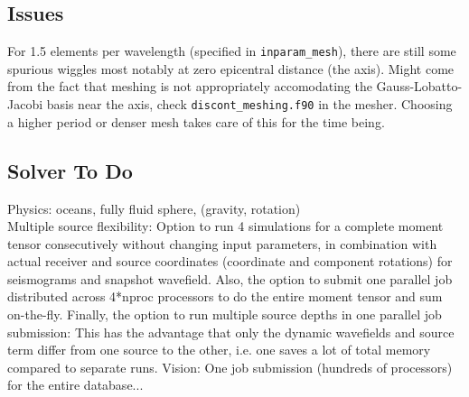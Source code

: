 \documentclass[11pt,letter,fleqn,english,notitlepage]{article}
\begin{document}
\subsection{Issues}
For 1.5 elements per wavelength (specified in {\tt inparam\_mesh}), there are
still some spurious wiggles most notably at zero epicentral distance (the
axis). Might come from the fact that meshing is not appropriately accomodating
the Gauss-Lobatto-Jacobi basis near the axis, check {\tt discont\_meshing.f90}
in the mesher.  Choosing a higher period or denser mesh takes care of this for
the time being.

\subsection{Solver To Do}
\noindent Physics: oceans, fully fluid sphere, (gravity, rotation)\\


\noindent Multiple source flexibility: Option to run 4 simulations for a
complete moment tensor consecutively without changing input parameters, in
combination with actual receiver and source coordinates (coordinate and
component rotations) for seismograms and snapshot wavefield.  Also, the option
to submit one parallel job distributed across 4*nproc processors to do the
entire moment tensor and sum on-the-fly. Finally, the option to run multiple
source depths in one parallel job submission: This has the advantage that only
the dynamic wavefields and source term differ from one source to the other,
i.e. one saves a lot of total memory compared to separate runs. Vision: One job
submission (hundreds of processors) for the entire database...\\

% 
\end{document}
